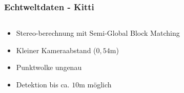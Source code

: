 \begin{frame}
    \frametitle{Echtweltdaten - Kitti}
    \begin{columns}
        \begin{column}{.4\textwidth}
            \begin{itemize}
                \item Stereo-berechnung mit Semi-Global Block Matching
                \item<2-> Kleiner Kameraabstand ($\si{0,54\m}$)
                \item<3-> Punktwolke ungenau
                \item<4-> Detektion bis ca. $\si{10\m}$ möglich
            \end{itemize}
        \end{column}
        \begin{column}{.6\textwidth}
            \begin{figure}[h!]
                \centering
            \end{figure}


\end{column}
\end{columns}
\end{frame}

